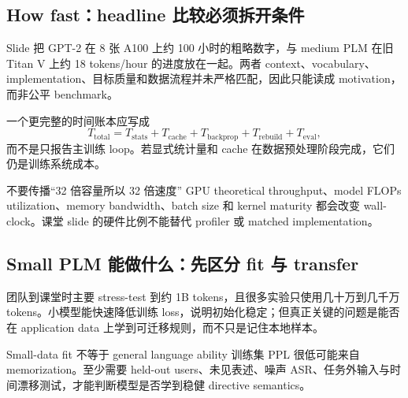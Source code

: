 
\subsection{How fast：headline 比较必须拆开条件}

Slide 把 GPT-2 在 8 张 A100 上约 100 小时的粗略数字，与 medium PLM 在旧 Titan V 上约 18 tokens/hour 的进度放在一起。两者 context、vocabulary、implementation、目标质量和数据流程并未严格匹配，因此只能读成 motivation，而非公平 benchmark。


一个更完整的时间账本应写成
\[
T_{\text{total}}=T_{\text{stats}}+T_{\text{cache}}
+T_{\text{backprop}}+T_{\text{rebuild}}+T_{\text{eval}},
\]
而不是只报告主训练 loop。若显式统计量和 cache 在数据预处理阶段完成，它们仍是训练系统成本。

\begin{warningbox}{不要传播“32 倍容量所以 32 倍速度”}
GPU theoretical throughput、model FLOPs utilization、memory bandwidth、batch size 和 kernel maturity 都会改变 wall-clock。课堂 slide 的硬件比例不能替代 profiler 或 matched implementation。
\end{warningbox}


\subsection{Small PLM 能做什么：先区分 fit 与 transfer}

团队到课堂时主要 stress-test 到约 1B tokens，且很多实验只使用几十万到几千万 tokens。小模型能快速降低训练 loss，说明初始化稳定；但真正关键的问题是能否在 application data 上学到可迁移规则，而不只是记住本地样本。


\begin{warningbox}{Small-data fit 不等于 general language ability}
训练集 PPL 很低可能来自 memorization。至少需要 held-out users、未见表述、噪声 ASR、任务外输入与时间漂移测试，才能判断模型是否学到稳健 directive semantics。
\end{warningbox}

